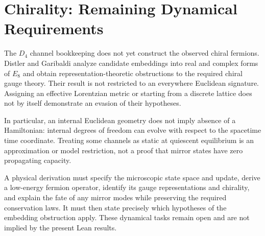 \section{Chirality: Remaining Dynamical Requirements}
\label{app:geometric_origin_of_chiral_fermions}
The $D_4$ channel bookkeeping does not yet construct the observed chiral fermions. Distler and Garibaldi analyze candidate embeddings into real and complex forms of $E_8$ and obtain representation-theoretic obstructions to the required chiral gauge theory\cite{distler_there_2010}. Their result is not restricted to an everywhere Euclidean signature. Assigning an effective Lorentzian metric or starting from a discrete lattice does not by itself demonstrate an evasion of their hypotheses.

In particular, an internal Euclidean geometry does not imply absence of a Hamiltonian: internal degrees of freedom can evolve with respect to the spacetime time coordinate. Treating some channels as static at quiescent equilibrium is an approximation or model restriction, not a proof that mirror states have zero propagating capacity.

A physical derivation must specify the microscopic state space and update, derive a low-energy fermion operator, identify its gauge representations and chirality, and explain the fate of any mirror modes while preserving the required conservation laws. It must then state precisely which hypotheses of the embedding obstruction apply. These dynamical tasks remain open and are not implied by the present Lean results.
